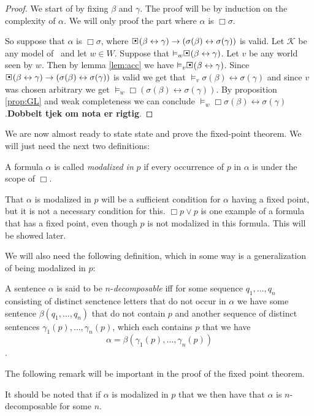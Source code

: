 \documentclass[../main.tex]{subfiles}
\begin{document}
\begin{proof}
	We start of by fixing $\beta$ and $\gamma$. The proof will be by
	induction on the complexity of $\alpha$. We will only proof the part
	where $\alpha$ is $\Box\sigma$.

	So suppose that $\alpha$ is $\Box\sigma$, where
	$\sBox(\beta\leftrightarrow\gamma)\rightarrow(\sigma(\beta)\leftrightarrow\sigma(\gamma))$
	is valid. Let $\mathcal{K}$ be any model of \GL\ and let $w\in W$.
	Suppose that $\vDash_w\sBox(\beta\leftrightarrow\gamma)$. Let $v$ be
	any world seen by $w$. Then by lemma \ref{lem:acc} we have
	$\vDash_v\sBox(\beta\leftrightarrow\gamma)$. Since 
	$\sBox(\beta\leftrightarrow\gamma)\rightarrow(\sigma(\beta)\leftrightarrow\sigma(\gamma))$
	is valid we get that
	$\vDash_v\sigma(\beta)\leftrightarrow\sigma(\gamma)$ and since
	$v$ was chosen arbitrary we get
	$\vDash_w\Box(\sigma(\beta)\leftrightarrow\sigma(\gamma))$. By
	proposition \ref{prop:GL} and weak completeness we can conclude
	$\vDash_w\Box\sigma(\beta)\leftrightarrow\sigma(\gamma)$.\textbf{Dobbelt
	tjek om nota er rigtig}.
\end{proof}

We are now almost ready to state state and prove the fixed-point theorem. We
will just need the next two definitions:
\begin{defi}
	A formula $\alpha$ is called \textit{modalized in} $p$ if every occurrence of
	$p$ in  $\alpha$ is under the scope of $\Box$.
\end{defi}
That  $\alpha$ is modalized in $p$ will be a sufficient  condition for $\alpha$
having a fixed point, but it is not a necessary condition for this. $\Box p\vee
p$ is one example of a formula that has a fixed point, even though $p$ is not
modalized in this formula.  This will be showed later.

We will also need the following definition, which in some way is a
generalization of being modalized in $p$:
\begin{defi}
	A sentence $\alpha$ is said to be $n$-\textit{decomposable} iff for some
	sequence $q_1,\ldots,q_n$ consisting of distinct senctence letters that
	do not occur in $\alpha$ we have some sentence $\beta(q_1,\ldots,q_n)$
	that do not contain $p$ and another sequence of distinct sentences 
	$\gamma_1(p),\ldots,\gamma_n(p)$, which each contains $p$ that we have
	$$\alpha=\beta(\gamma_1(p),\ldots,\gamma_n(p))$$.
\end{defi}
The following remark will be important in the proof of the fixed point theorem.
\begin{remark}
It should be noted that if $\alpha$ is modalized in $p$ that we then have that
$\alpha$ is $n$-decomposable for some $n$.
\end{remark}
\end{document}
